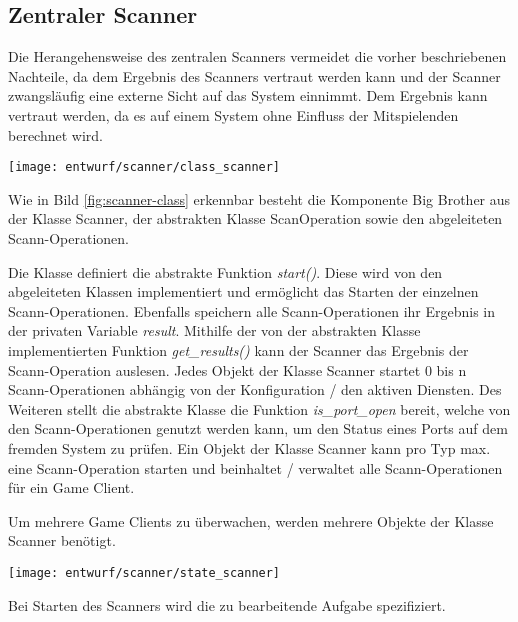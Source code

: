 \subsection{Zentraler Scanner}
Die Herangehensweise des zentralen Scanners vermeidet die vorher beschriebenen Nachteile, da dem Ergebnis des Scanners vertraut werden kann und der Scanner zwangsläufig eine externe Sicht auf das System einnimmt. Dem Ergebnis kann vertraut werden, da es auf einem System ohne Einfluss der Mitspielenden berechnet wird.

\begin{center}
	\texttt{[image: entwurf/scanner/class\_scanner]}
	\label{fig:scanner-class}
\end{center}

Wie in Bild \ref{fig:scanner-class} erkennbar besteht die Komponente Big Brother aus der Klasse Scanner, der abstrakten Klasse ScanOperation sowie den abgeleiteten Scann-Operationen.

Die Klasse  definiert die abstrakte Funktion \textit{start()}. Diese wird von den abgeleiteten Klassen implementiert und ermöglicht das Starten der einzelnen Scann-Operationen. Ebenfalls speichern alle Scann-Operationen ihr Ergebnis in der privaten Variable \textit{result}. Mithilfe der von der abstrakten Klasse implementierten Funktion \textit{get\_results()} kann der Scanner das Ergebnis der Scann-Operation auslesen. Jedes Objekt der Klasse Scanner startet 0 bis n Scann-Operationen abhängig von der Konfiguration / den aktiven Diensten. Des Weiteren stellt die abstrakte Klasse die Funktion \textit{is\_port\_open} bereit, welche von den Scann-Operationen genutzt werden kann, um den Status eines Ports auf dem fremden System zu prüfen. Ein Objekt der Klasse Scanner kann pro Typ max. eine Scann-Operation starten und beinhaltet / verwaltet alle Scann-Operationen für ein Game Client. 

Um mehrere Game Clients zu überwachen, werden mehrere Objekte der Klasse Scanner benötigt.

\begin{center}
	\texttt{[image: entwurf/scanner/state\_scanner]}
	\label{fig:scanner-state}
\end{center}

Bei Starten des Scanners wird die zu bearbeitende Aufgabe spezifiziert.

